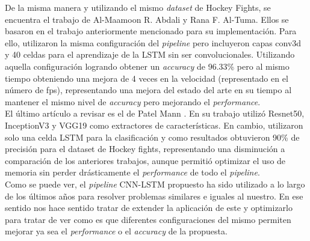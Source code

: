 De la misma manera y utilizando el mismo \textit{dataset} de 
Hockey Fights, se encuentra el trabajo de Al-Maamoon R. Abdali 
y Rana F. Al-Tuma\cite{Abdali2019}. Ellos se basaron en el 
trabajo anteriormente mencionado para su implementación. 
Para ello, utilizaron la misma configuración del 
\textit{pipeline} pero incluyeron capas 
conv3d y 40 celdas para el aprendizaje de la LSTM sin ser 
convolucionales. Utilizando aquella configuración logrando 
obtener un \textit{accuracy} de 96.33\% 
pero al mismo tiempo obteniendo una mejora de 4 veces en la 
velocidad (representado en el número de fps), representando 
una mejora del estado del arte en su tiempo al mantener el 
mismo nivel de \textit{accuracy} pero mejorando el 
\textit{performance}.\\


El último artículo a revisar es el de Patel Mann 
\cite{Mann2021}. En su trabajo utilizó Resnet50, InceptionV3 
y VGG19 como extractores de características. En cambio, 
utilizaron solo una celda LSTM para la clasificación y como 
resultados obtuvieron 90\% de precisión para 
el dataset de Hockey fights, representando una disminución a 
comparación de los anteriores trabajos, aunque permitió optimizar 
el uso de memoria sin perder drásticamente el \textit{performance} 
de todo el \textit{pipeline}.\\

Como se puede ver, el \textit{pipeline} CNN-LSTM propuesto ha 
sido utilizado a lo largo de los últimos años para resolver 
problemas similares e iguales al nuestro. En ese sentido nos hace 
sentido tratar de extender la aplicación de este y optimizarlo 
para tratar de ver como es que diferentes configuraciones del 
mismo permiten mejorar ya sea el \textit{performance} o el 
\textit{accuracy} de la propuesta.


